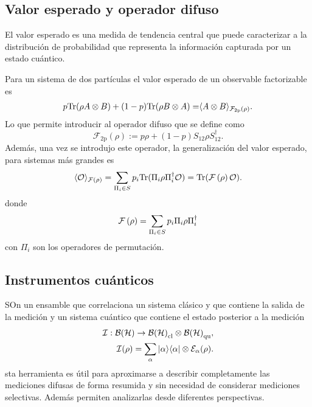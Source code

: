 \documentclass[12pt,letterpaper]{book}\raggedbottom{}
\begin{document}
\subsection{Valor esperado y operador difuso}
El valor esperado es una medida de tendencia central que puede caracterizar a la distribución de probabilidad que representa la información capturada por un estado cuántico.

Para un sistema de dos partículas el valor esperado de un observable factorizable es 
\begin{equation}\label{eq:Expected-Value-FM-2p}
    \begin{split}
         p{\rm Tr}(\rho A\otimes B)+(1-p){\rm Tr}(\rho B\otimes A)=&\langle {A\otimes B}\rangle_{\mathcal{F}_{2\text{p}}(\rho)}.\\
    \end{split}
\end{equation}Lo que permite introducir al operador difuso que se define como \begin{equation}\label{eq:op_F2p}
    \mathcal{F}_{2\text{p}}(\rho):=p\rho + (1-p)S_{12}\rho S_{12}^{\dagger}.
\end{equation}Además, una vez se introdujo este operador, la generalización del valor esperado, para sistemas más grandes es 
\begin{equation}\label{eq:expected-value-fm-general}
    \langle \mathcal{O}\rangle_{\mathcal{F}\left(\rho\right)}=\sum_{\Pi_i\in S}p_i{\rm Tr}(\Pi_{i}\rho\Pi_{i}^{\dagger}\mathcal{O}) ={\rm Tr}(\mathcal{F}\left(\rho\right)\mathcal{O}).
\end{equation} donde \begin{equation}\label{eq:fuzzy-op-nparticles}
    \mathcal{F}\left(\rho\right)=\sum_{\Pi_i\in S}p_{i}\Pi_{i}\rho\Pi_{i}^{\dagger}
 \end{equation} con $\Pi_i$ son los operadores de permutación.


\subsection{Instrumentos cuánticos}
SOn un ensamble que correlaciona un sistema clásico y que contiene la salida de la medición y un sistema cuántico que contiene el estado posterior a la medición \begin{equation}
    \begin{split}
        \mathcal{I}: \mathcal{B(H)}\rightarrow\mathcal{B(H)}_{\text{cl}}\otimes \mathcal{B(H)}_{\text{qu}},\\
    \mathcal{I}(\rho)=\sum_\alpha |\alpha\rangle \langle\alpha|\otimes \mathcal{E}_\alpha(\rho).
    \end{split}
\end{equation}sta herramienta es útil para aproximarse
a describir completamente las mediciones difusas de forma resumida y sin necesidad de
considerar mediciones selectivas. Además permiten analizarlas desde diferentes perspectivas.
\end{document}
